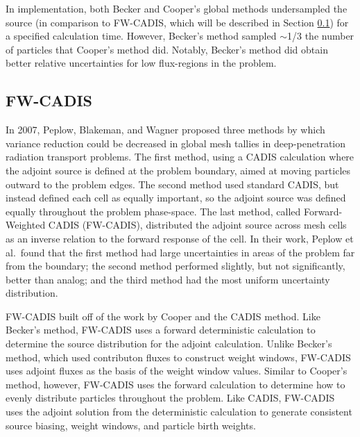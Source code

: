 In implementation, both Becker and Cooper's global methods
undersampled the source (in comparison to FW-CADIS, which will be described in
Section \ref{subsec:FWCADIS}) for a specified calculation
time. However, Becker's method sampled $\sim$1/3 the number of particles that
Cooper's method did. Notably, Becker's method did obtain better relative
uncertainties for low flux-regions in the problem.

\subsection{FW-CADIS}
\label{subsec:FWCADIS}

In 2007, Peplow, Blakeman, and Wagner \cite{peplow_advanced_2007} proposed three
methods by which variance reduction could be decreased in global mesh tallies in
deep-penetration radiation transport problems. The first method, using a CADIS
calculation where the adjoint source is defined at the problem boundary, aimed
at moving particles outward to the problem edges.
The second method used standard CADIS, but instead
defined each cell as equally important, so the adjoint source was defined
equally throughout the problem phase-space. The last method, called Forward-Weighted
CADIS (FW-CADIS), distributed the adjoint source across mesh cells as an inverse
relation to the forward response of the cell. In their work, Peplow et al.\ found
that the first method had large uncertainties in areas of the problem far
from the boundary; the second method performed slightly, but not significantly,
better than analog; and the third method had the most uniform uncertainty
distribution.

FW-CADIS
\cite{wagner_forward-weighted_2007,wagner_forward-weighted_2009,wagner_forward-weighted_2010}
built off of the work by Cooper and the CADIS method.
Like Becker's method, FW-CADIS uses a forward deterministic calculation to
determine the source distribution for the adjoint calculation. Unlike Becker's
method, which used contributon fluxes to construct weight windows,
FW-CADIS uses adjoint fluxes as the basis of the weight window values. Similar to
Cooper's method, however, FW-CADIS uses the forward calculation to determine how to
evenly distribute particles throughout the problem. Like CADIS, FW-CADIS uses
the adjoint solution from the deterministic calculation to generate consistent
source biasing, weight windows, and particle birth weights.


